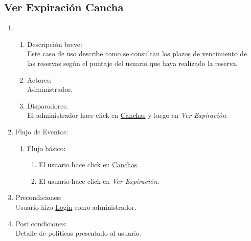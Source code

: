 \documentclass[a4paper,11pt]{article}
\begin{document}
\subsection{Ver Expiraci\'on Cancha}
\begin{enumerate}
    \item
    \begin{enumerate}
    \item Descripci\'on breve: \\
        Este caso de uso describe como se consultan los plazos de vencimiento de
        las reservas seg\'un el puntaje del usuario que haya realizado la reserva.
    \item Actores: \\
        Administrador.
    \item Disparadores: \\
        El administrador hace click en \underline{Canchas} y luego en \emph{Ver Expiraci\'on}.
    \end{enumerate}
    \item Flujo de Eventos: 
    \begin{enumerate}
        \item Flujo b\'asico:
		\begin{enumerate}
            		\item El usuario hace click en \underline{Canchas}.
            		\item El usuario hace click en \emph{Ver Expiraci\'on}.
		\end{enumerate}
    \end{enumerate}
    \item Precondiciones: \\
        Usuario hizo \underline{Login} como administrador.\\
    \item Post condiciones: \\
	Detalle de politicas presentado al usuario.
\end{enumerate}

\end{document}
